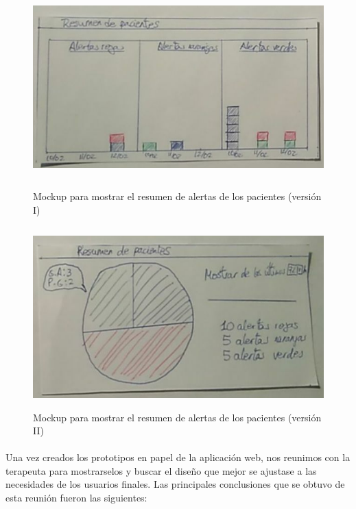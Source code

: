 \begin{figure}
    \centering
    \begin{minipage}{.45\textwidth}
        \centering
        \includegraphics[width=0.8\linewidth, height=7cm]{Imagenes/anxA11-1.png}
        \caption[Mockup para mostrar el resumen de alertas de los pacientes (versión I)]{Mockup para mostrar el resumen de alertas de los pacientes (versión I)}
        \label{fig:c4:mockup19}
    \end{minipage}
    \hfill\vline\hfill
    \begin{minipage}{.45\textwidth}
        \centering
        \includegraphics[width=0.8\linewidth, height=7cm]{Imagenes/anxA11-2.png}
        \caption[Mockup para mostrar el resumen de alertas de los pacientes (versión II)]{Mockup para mostrar el resumen de alertas de los pacientes (versión II)}
        \label{fig:c4:mockup20}
    \end{minipage}
\end{figure}

\paragraph{}
Una vez creados los prototipos en papel de la aplicación web, nos reunimos con la terapeuta para mostrarselos y buscar el diseño que mejor se ajustase a las necesidades de los usuarios finales. Las principales conclusiones que se obtuvo de esta reunión fueron las siguientes:


